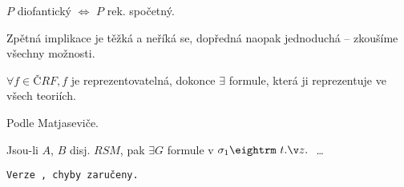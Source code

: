  $P$ diofantický $\iff$ $P$ rek. spočetný.

\prf{} Zpětná implikace je těžká a neříká se, dopředná naopak jednoduchá -- zkoušíme všechny možnosti.

\thm{} $\forall f \in ČRF, f$ je reprezentovatelná, dokonce $\exists$ formule, která ji reprezentuje ve všech teoriích.

\prf{} Podle Matjaseviče.

\res{}  Jsou-li $A$, $B$ disj. $RSM$, pak $\exists G$ formule v $\sigma_1 \st$ \dots

{\tt Verze \versionnumber, chyby zaručeny.} 
\bye
